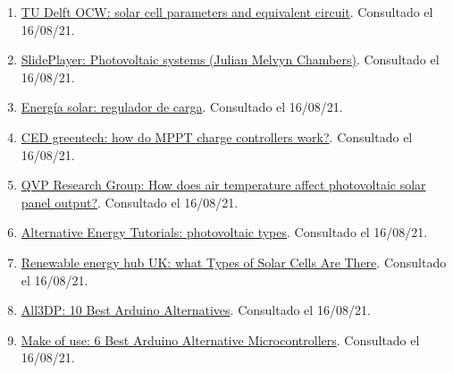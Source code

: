 \documentclass[12pt]{article}
\begin{document}
\begin{enumerate}
			\item 
			\label{bib: TU delft OCW solar cell param}
			\href{https://ocw.tudelft.nl/wp-content/uploads/solar_energy_section_9_1_9_3.pdf}{TU Delft OCW: solar cell parameters and equivalent circuit}. Consultado el 16/08/21.
			
			\item 
			\label{bib: SlidePlayer Photovoltaic systems}
			\href{https://slideplayer.com/slide/9144319/}{SlidePlayer: Photovoltaic systems (Julian Melvyn Chambers)}. Consultado el 16/08/21.
			
			\item 
			\label{bib: energia solar regulador de carga}
			\href{https://solar-energia.net/energia-solar-fotovoltaica/elementos/instalaciones-autonomas/reguladores-carga}{Energía solar: regulador de carga}. Consultado el 16/08/21.
			
			\item 
			\label{bib: CED greentech how mppt works}
			\href{https://www.cedgreentech.com/article/how-do-mppt-charge-controllers-work}{CED greentech: how do MPPT charge controllers work?}. Consultado el 16/08/21.
			
			\item 
			\label{bib: QVP air temp affect solar panel output}
			\href{https://www.qpvgroup.org/blog/2019/2/3/how-does-air-temperature-affect-photovoltaic-solar-panel-output}{QVP Research Group: How does air temperature affect photovoltaic solar panel output?}. Consultado el 16/08/21.
			
			\item 
			\label{bib: alternative energy photovoltaic types}
			\href{https://www.alternative-energy-tutorials.com/photovoltaics/photovoltaic-types.html}{Alternative Energy Tutorials: photovoltaic types}. Consultado el 16/08/21.
			
			\item 
			\label{bib: renewable energy hub main types photo cells}
			\href{https://www.renewableenergyhub.co.uk/main/solar-panels/types-of-solar-cell/}{Renewable energy hub UK: what Types of Solar Cells Are There}. Consultado el 16/08/21.
			
			\item 
			\label{bib: arduino alternatives}
			\href{https://all3dp.com/2/best-arduino-alternatives/}{All3DP: 10 Best Arduino Alternatives}. Consultado el 16/08/21.
			
			\item 
			\label{bib: microcontrollers alternative to arduino}
			\href{https://www.makeuseof.com/tag/best-arduino-alternative-microcontrollers/}{Make of use: 6 Best Arduino Alternative Microcontrollers}. Consultado el 16/08/21.
			

\end{enumerate}
\end{document}
